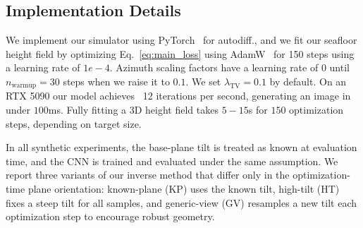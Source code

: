 \subsection{Implementation Details}
We implement our simulator using PyTorch~\cite{Paszke2019Pytorch} for autodiff., and we fit our seafloor height field by optimizing Eq.~\ref{eq:main_loss} using AdamW~\cite{2019LoshchilovAdamW} for 150 steps using a learning rate of \(1e-4\). Azimuth scaling factors have a learning rate of \(0\) until \(n_{\text{warmup}}=30\) steps when we raise it to \(0.1\). We set \(\lambda_{\text{TV}}=0.1\) by default. On an RTX 5090 our model achieves ~12 iterations per second, generating an image in under \(100\)ms. Fully fitting a 3D height field takes \(5-15\)s for \(150\) optimization steps, depending on target size.

In all synthetic experiments, the base-plane tilt is treated as known at evaluation time, and the CNN is trained and evaluated under the same assumption. We report three variants of our inverse method that differ only in the {optimization-time} plane orientation: known-plane (KP) uses the known tilt, high-tilt (HT) fixes a steep tilt for all samples, and generic-view (GV) resamples a new tilt each optimization step to encourage robust geometry.